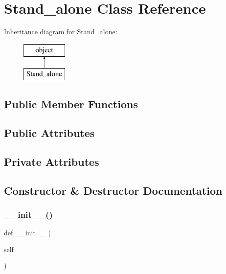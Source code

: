 \hypertarget{classopenbu_1_1standalone_1_1_stand__alone}{}\section{Stand\+\_\+alone Class Reference}
\label{classopenbu_1_1standalone_1_1_stand__alone}
Inheritance diagram for Stand\+\_\+alone\+:\begin{figure}[H]
\begin{center}
\leavevmode
\includegraphics[height=2.000000cm]{classopenbu_1_1standalone_1_1_stand__alone}
\end{center}
\end{figure}
\subsection*{Public Member Functions}
\subsection*{Public Attributes}
\subsection*{Private Attributes}


\subsection{Constructor \& Destructor Documentation}
\mbox{\label{classopenbu_1_1standalone_1_1_stand__alone_a2dcc09b754adc5a60a67fe9abf373472}} 
\subsubsection{\texorpdfstring{\+\_\+\+\_\+init\+\_\+\+\_\+()}{\_\_init\_\_()}}
{\footnotesize\ttfamily def \+\_\+\+\_\+init\+\_\+\+\_\+ (\begin{DoxyParamCaption}\item[{}]{self }\end{DoxyParamCaption})}



